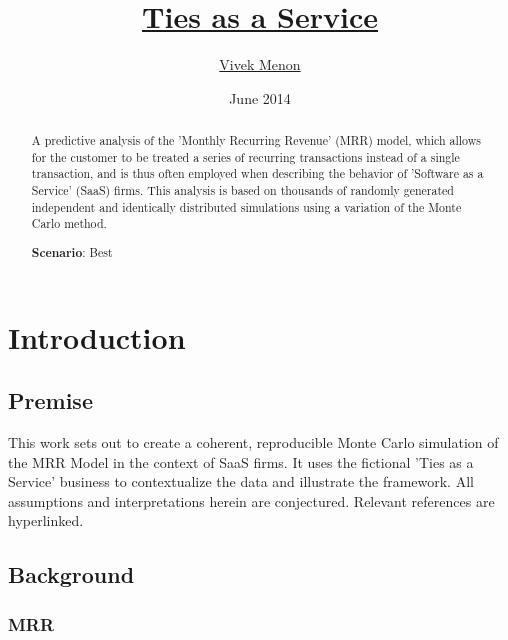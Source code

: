 \documentclass[11pt]{article}
\begin{document}


\title{\href{http://vvkmnn.wordpress.com/2014/06/12/saas-and-r/}{Ties as a Service}}
\author{\href{http://vvkmnn.wordpress.com/}{Vivek Menon}}
\date{June 2014}
\maketitle

\bigskip\bigskip\bigskip
\bigskip\bigskip\bigskip
\bigskip\bigskip\bigskip


\begin{abstract}
A predictive analysis of the 'Monthly Recurring Revenue' (MRR) model, which allows for the customer to be treated a series of recurring transactions instead of a single transaction, and is thus often employed when describing  the behavior of 'Software as a Service' (SaaS) firms. This  analysis is based on thousands of randomly generated independent and identically distributed simulations using a variation of the Monte Carlo method.

\begin{center}
\textbf{Scenario}: Best 
\end{center}
\end{abstract}




\newpage


\section*{Introduction}

\subsection*{Premise}
This work sets out to create a coherent, reproducible Monte Carlo simulation of the MRR Model in the context of SaaS firms. It uses the fictional 'Ties as a Service' business to contextualize the data and illustrate the framework. All assumptions and interpretations herein are conjectured.  Relevant references are hyperlinked.

\subsection*{Background}

\subsubsection*{MRR}
\end{document}
